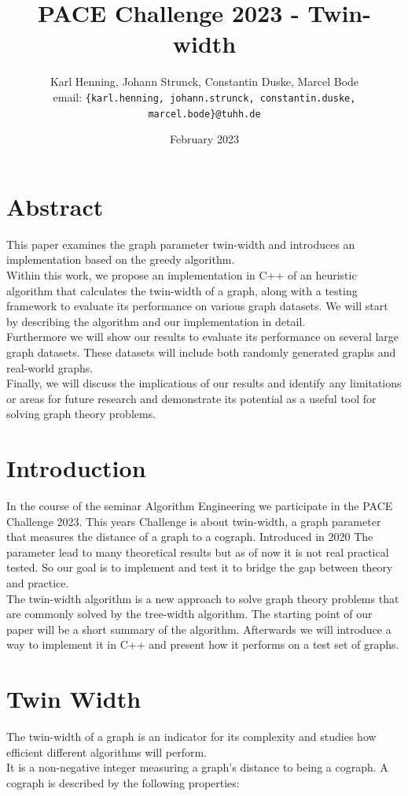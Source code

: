 \documentclass[10pt]{article}
\date{February 2023}
\title{PACE Challenge 2023 - Twin-width}
\author{
    Karl Henning, Johann Strunck, Constantin Duske, Marcel Bode\\
    email: \texttt{\{karl.henning, johann.strunck, constantin.duske, marcel.bode\}@tuhh.de}
}
\begin{document}
\maketitle{}
\section{Abstract}

This paper examines the graph parameter twin-width and introduces an implementation based on the greedy algorithm.\\
Within this work, we propose an implementation in C++ of an heuristic algorithm that calculates the twin-width of a graph, along with a testing framework to evaluate its performance on various graph datasets. We will start by describing the algorithm and our implementation in detail.\\
Furthermore we will show our results to evaluate its performance on several large graph datasets. These datasets will include both randomly generated graphs and real-world graphs.\\
Finally, we will discuss the implications of our results and identify any limitations or areas for future research and demonstrate its potential as a useful tool for solving graph theory problems.

\section{Introduction}


In the course of the seminar Algorithm Engineering we participate in the PACE Challenge 2023.\cite{PACE} This years
Challenge is about twin-width, a graph parameter that measures the distance of a graph to
a cograph. Introduced in 2020 The parameter lead to many theoretical results but as
of now it is not real practical tested. \cite{Bonnet2020,Hlineny2022,Jacob2022} So our goal is to implement and test it to bridge
the gap between theory and practice.\\ The twin-width algorithm is a new approach to
solve graph theory problems that are commonly solved by the tree-width algorithm. The
starting point of our paper will be a short summary of the algorithm. Afterwards we will
introduce a way to implement it in C++ and present how it performs on a test set of graphs.

\section{Twin Width}
The twin-width of a graph is an indicator for its complexity and studies how efficient
different algorithms will perform.\\
It is a non-negative integer measuring a graph's distance to being a cograph. A
cograph is described by the following properties:
\end{document}
